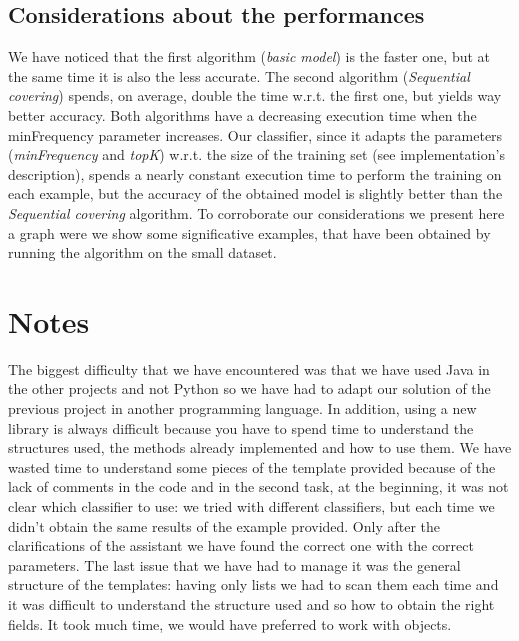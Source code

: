 \documentclass[11pt, a4paper]{article}
\begin{document}
	\subsection{Considerations about the performances}
		We have noticed that the first algorithm (\textit{basic model}) is the faster one, but at the same time it is also the less accurate. The second algorithm (\textit{Sequential covering}) spends, on average, double the time w.r.t. the first one, but yields way better accuracy. Both algorithms have a decreasing execution time when the minFrequency parameter increases.
		Our classifier, since it adapts the parameters (\textit{minFrequency} and \textit{topK}) w.r.t. the size of the training set (see implementation's description), spends a nearly constant execution time to perform the training on each example, but the accuracy of the obtained model is slightly better than the \textit{Sequential covering} algorithm.
		To corroborate our considerations we present here a graph were we show some significative examples, that have been obtained by running the algorithm on the small dataset.

	
	
	\section{Notes}
	The biggest difficulty that we have encountered was that we have used Java in the other projects and not Python so we have had to adapt our solution of the previous project in another programming language. In addition, using a new library is always difficult because you have to spend time to understand the structures used, the methods already implemented and how to use them. \newline
	We have wasted time to understand some pieces of the template provided because of the lack of comments in the code and in the second task, at the beginning, it was not clear which classifier to use: we tried with different classifiers, but each time we didn't obtain the same results of the example provided. \newline Only after the clarifications of the assistant we have found the correct one with the correct parameters. \newline
	The last issue that we have had to manage it was the general structure of the templates: having only lists we had to scan them each time and it was difficult to understand the structure used and so how to obtain the right fields. It took much time, we would have preferred to work with objects.    
		
\end{document}
